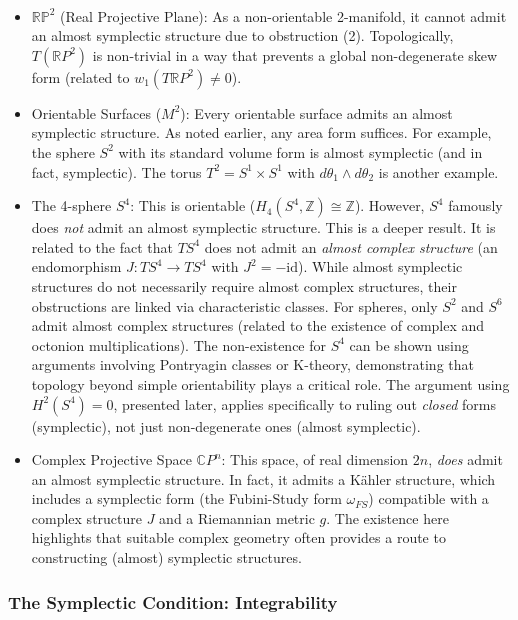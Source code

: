 \begin{example}
    \label{ex:almost_symp_obs}
    \,
    \begin{itemize}
        \item $\mathbb{RP}^2$ (Real Projective Plane): As a non-orientable 2-manifold, it cannot admit an almost symplectic structure due to obstruction (2). Topologically, $T(\mathbb{R}P^2)$ is non-trivial in a way that prevents a global non-degenerate skew form (related to $w_1(T\mathbb{R}P^2) \neq 0$).
        \item Orientable Surfaces ($M^2$): Every orientable surface admits an almost symplectic structure. As noted earlier, any area form suffices. For example, the sphere $S^2$ with its standard volume form is almost symplectic (and in fact, symplectic). The torus $T^2 = S^1 \times S^1$ with $d\theta_1 \wedge d\theta_2$ is another example.
        \item The 4-sphere $S^4$: This is orientable ($H_4(S^4, \mathbb{Z}) \cong \mathbb{Z}$). However, $S^4$ famously does \textit{not} admit an almost symplectic structure. This is a deeper result. It is related to the fact that $TS^4$ does not admit an \textit{almost complex structure} (an endomorphism $J: TS^4 \to TS^4$ with $J^2 = -\text{id}$). While almost symplectic structures do not necessarily require almost complex structures, their obstructions are linked via characteristic classes. For spheres, only $S^2$ and $S^6$ admit almost complex structures (related to the existence of complex and octonion multiplications). The non-existence for $S^4$ can be shown using arguments involving Pontryagin classes or K-theory, demonstrating that topology beyond simple orientability plays a critical role. The argument using $H^2(S^4)=0$, presented later, applies specifically to ruling out \textit{closed} forms (symplectic), not just non-degenerate ones (almost symplectic).
        \item Complex Projective Space $\mathbb{C}P^n$: This space, of real dimension $2n$, \textit{does} admit an almost symplectic structure. In fact, it admits a Kähler structure, which includes a symplectic form (the Fubini-Study form $\omega_{FS}$) compatible with a complex structure $J$ and a Riemannian metric $g$. The existence here highlights that suitable complex geometry often provides a route to constructing (almost) symplectic structures.
    \end{itemize}
\end{example}

\subsubsection{The Symplectic Condition: Integrability}

